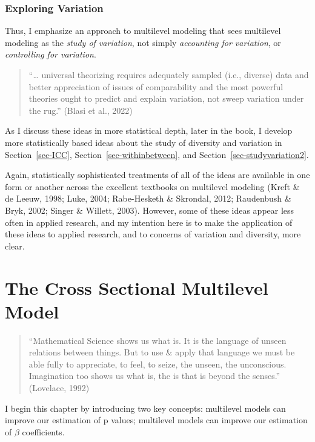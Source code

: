\documentclass[
  letterpaper,
  DIV=11,
  numbers=noendperiod]{scrreprt}
\begin{document}
\subsection{Exploring Variation}\label{exploring-variation}

Thus, I emphasize an approach to multilevel modeling that sees
multilevel modeling as the \emph{study of variation}, not simply
\emph{accounting for variation}, or \emph{controlling for variation}.
 

\begin{quote}
``\ldots{} universal theorizing requires adequately sampled (i.e.,
diverse) data and better appreciation of issues of comparability and the
most powerful theories ought to predict and explain variation, not sweep
variation under the rug.'' (Blasi et al., 2022)
\end{quote}

As I discuss these ideas in more statistical depth, later in the book, I
develop more statistically based ideas about the study of diversity and
variation in Section~\ref{sec-ICC}, Section~\ref{sec-withinbetween}, and
Section~\ref{sec-studyvariation2}.

Again, statistically sophisticated treatments of all of the ideas are
available in one form or another across the excellent textbooks on
multilevel modeling (Kreft \& de Leeuw, 1998; Luke, 2004; Rabe-Hesketh
\& Skrondal, 2012; Raudenbush \& Bryk, 2002; Singer \& Willett, 2003).
However, some of these ideas appear less often in applied research, and
my intention here is to make the application of these ideas to applied
research, and to concerns of variation and diversity, more clear.


\chapter{The Cross Sectional Multilevel
Model}\label{the-cross-sectional-multilevel-model}

\begin{quote}
``Mathematical Science shows us what is. It is the language of unseen
relations between things. But to use \& apply that language we must be
able fully to appreciate, to feel, to seize, the unseen, the
unconscious. Imagination too shows us what is, the is that is beyond the
senses.'' (Lovelace, 1992)
\end{quote}

I begin this chapter by introducing two key concepts: multilevel models
can improve our estimation of p values; multilevel models can improve
our estimation of \(\beta\) coefficients. 
\end{document}
